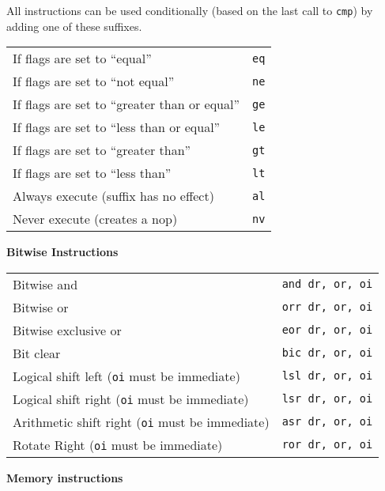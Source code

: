 \documentclass{article}
\begin{document}
All instructions can be used conditionally (based on the last call to
{\tt cmp}) by adding one of these suffixes.

\begin{tabular}{ll}
If flags are set to ``equal'' & {\tt eq} \\
If flags are set to ``not equal'' & {\tt ne} \\
If flags are set to ``greater than or equal'' & {\tt ge} \\
If flags are set to ``less than or equal'' & {\tt le} \\
If flags are set to ``greater than'' & {\tt gt} \\
If flags are set to ``less than'' & {\tt lt} \\
Always execute (suffix has no effect) & {\tt al} \\
Never execute (creates a nop) & {\tt nv} \\
\end{tabular}

\vspace{1em}
\noindent
\textbf{Bitwise Instructions}

\begin{tabular}{ll}
Bitwise and & {\tt and dr, or, oi} \\
Bitwise or & {\tt orr dr, or, oi} \\
Bitwise exclusive or & {\tt eor dr, or, oi} \\
Bit clear & {\tt bic dr, or, oi} \\
Logical shift left ({\tt oi} must be immediate) & {\tt lsl dr, or, oi} \\
Logical shift right ({\tt oi} must be immediate) & {\tt lsr dr, or, oi} \\
Arithmetic shift right ({\tt oi} must be immediate) & {\tt asr dr, or, oi} \\
Rotate Right ({\tt oi} must be immediate) & {\tt ror dr, or, oi} \\
\end{tabular}

\pagebreak

\noindent
\textbf{Memory instructions}
\end{document}
